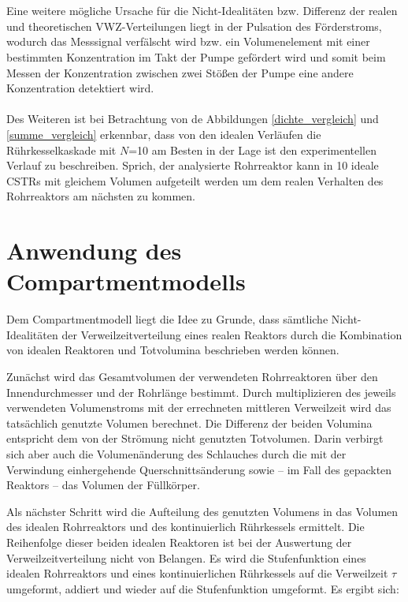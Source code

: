 \documentclass[12pt,liststotoc]{report}
\begin{document}
\\
\\
Eine weitere mögliche Ursache für die Nicht-Idealitäten bzw. Differenz der realen und theoretischen VWZ-Verteilungen liegt in der Pulsation des Förderstroms, wodurch das Messsignal verfälscht wird bzw. ein Volumenelement mit einer bestimmten Konzentration im Takt der Pumpe gefördert wird und somit beim Messen der Konzentration zwischen zwei Stößen der Pumpe eine andere Konzentration detektiert wird. 
\\
\\
Des Weiteren ist bei Betrachtung von de Abbildungen \ref{dichte_vergleich} und \ref{summe_vergleich} erkennbar, dass von den idealen Verläufen die Rührkesselkaskade mit $N$=10 am Besten in der Lage ist den experimentellen Verlauf zu beschreiben. Sprich, der analysierte Rohrreaktor kann in 10 ideale CSTRs mit gleichem Volumen aufgeteilt werden um dem realen Verhalten des Rohrreaktors am nächsten zu kommen. 
\newpage

\section{Anwendung des Compartmentmodells}

Dem Compartmentmodell liegt die Idee zu Grunde, dass sämtliche Nicht-Idealitäten der Verweilzeitverteilung eines realen Reaktors durch die Kombination von idealen Reaktoren und Totvolumina beschrieben werden können.
\par Zunächst wird das Gesamtvolumen der verwendeten Rohrreaktoren über den Innendurchmesser und der Rohrlänge bestimmt. Durch multiplizieren des jeweils verwendeten Volumenstroms mit der errechneten mittleren Verweilzeit wird das tatsächlich genutzte Volumen berechnet. Die Differenz der beiden Volumina entspricht dem von der Strömung nicht genutzten Totvolumen. Darin verbirgt sich aber auch die Volumenänderung des Schlauches durch die mit der Verwindung einhergehende Querschnittsänderung sowie – im Fall des gepackten Reaktors – das Volumen der Füllkörper.
\par Als nächster Schritt wird die Aufteilung des genutzten Volumens in das Volumen des idealen Rohrreaktors und des kontinuierlich Rührkessels ermittelt. Die Reihenfolge dieser beiden idealen Reaktoren ist bei der Auswertung der Verweilzeitverteilung nicht von Belangen. Es wird die Stufenfunktion eines idealen Rohrreaktors und eines kontinuierlichen Rührkessels auf die Verweilzeit $\tau$ umgeformt, addiert und wieder auf die Stufenfunktion umgeformt. Es ergibt sich:
\end{document}
